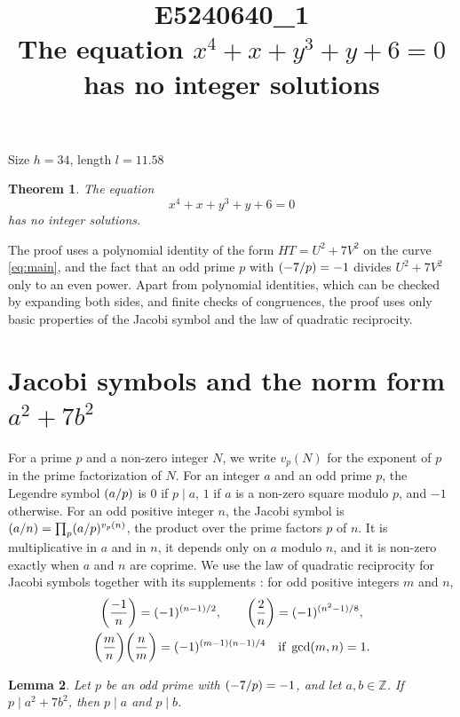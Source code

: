 \documentclass[11pt]{article}
\title{\textbf{E5240640\_1}\\[4pt] {\Large The equation $x^{4}+x+y^{3}+y+6=0$ has no integer solutions}}
\author{}
\date{}
\newtheorem{theorem}{Theorem}
\newtheorem{lemma}[theorem]{Lemma}
\newcommand{\Z}{\mathbb{Z}}
\newcommand{\leg}[2]{\mathchoice{\biggl(\dfrac{#1}{#2}\biggr)}{(#1/#2)}{(#1/#2)}{(#1/#2)}}
\begin{document}
\maketitle
\vspace{-8ex}
\begin{center}
Size $h=34$, length $l=11.58$
\end{center}

\begin{theorem}\label{thm:main}
The equation
\begin{equation}\label{eq:main}
x^{4}+x+y^{3}+y+6=0
\end{equation}
has no integer solutions.
\end{theorem}

The proof uses a polynomial identity of the form $HT=U^2+7V^2$ on the curve \eqref{eq:main}, and the fact that an odd prime $p$ with $\leg{-7}{p}=-1$ divides $U^2+7V^2$ only to an even power. Apart from polynomial identities, which can be checked by expanding both sides, and finite checks of congruences, the proof uses only basic properties of the Jacobi symbol and the law of quadratic reciprocity.

\section{\texorpdfstring{Jacobi symbols and the norm form $a^2+7b^2$}{Jacobi symbols and the norm form}}

For a prime $p$ and a non-zero integer $N$, we write $v_p(N)$ for the exponent of $p$ in the prime factorization of $N$. For an integer $a$ and an odd prime $p$, the Legendre symbol $\leg{a}{p}$ is $0$ if $p\mid a$, $1$ if $a$ is a non-zero square modulo $p$, and $-1$ otherwise. For an odd positive integer $n$, the Jacobi symbol is $\leg{a}{n}=\prod_p\leg{a}{p}^{v_p(n)}$, the product over the prime factors $p$ of $n$. It is multiplicative in $a$ and in $n$, it depends only on $a$ modulo $n$, and it is non-zero exactly when $a$ and $n$ are coprime. We use the law of quadratic reciprocity for Jacobi symbols together with its supplements \cite[Chapter~5, \S2]{IR}: for odd positive integers $m$ and $n$,
\begin{gather*}
\leg{-1}{n}=(-1)^{(n-1)/2},\qquad\leg{2}{n}=(-1)^{(n^2-1)/8},\\
\leg{m}{n}\leg{n}{m}=(-1)^{(m-1)(n-1)/4}\quad\text{if }\gcd(m,n)=1.
\end{gather*}

\begin{lemma}\label{lem:divides}
Let $p$ be an odd prime with $\leg{-7}{p}=-1$, and let $a,b\in\Z$. If $p\mid a^2+7b^2$, then $p\mid a$ and $p\mid b$.
\end{lemma}
\end{document}
